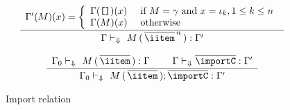 \begin{figure}
\[ \begin{array}{cc}
	\displaystyle\frac
	 {\begin{array}{ll}
            \Gamma'(M)(x) = \left\{ \begin{array}{ll}
              \Gamma(\texttt{[]})(x) & \text{ if } M = \gamma \text{ and } x = \iota_k, %
                                                                           1 \leq k \leq n\\
               \Gamma(M)(x)          & \text{ otherwise}
             \end{array}\right.
          \end{array}}
	 {\Gamma \vdash_{\Downarrow} \ M\, (\,\overline{\iitem}^{\,n}\,) : \Gamma'} \\ \\

	\displaystyle\frac
	 {\begin{array}{ll}
	   \Gamma_0 \vdash_{\Downarrow} \ M\, (\,\overline{\iitem}\,) : \Gamma \:\:\: & \:\:\: 
           \Gamma \vdash_{\Downarrow} \overline{\importC} : \Gamma'
          \end{array}}
	 {\Gamma_0 \vdash_{\Downarrow} \ M\, (\,\overline{\iitem}\,); \overline{\importC} : \Gamma'} 
\end{array} \]
\caption{Import relation}
\label{fig:import-relation}
\end{figure}

